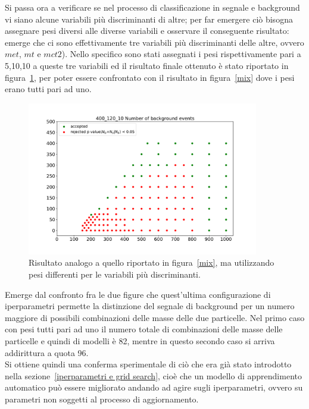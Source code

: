 \newpage

Si passa ora a verificare se nel processo di classificazione in segnale e background vi siano alcune variabili più discriminanti di altre; per far emergere ciò bisogna assegnare pesi diversi alle diverse variabili e osservare il conseguente risultato: emerge che ci sono effettivamente tre variabili più discriminanti delle altre, ovvero $\textit{met}$, $\textit{mt}$ e $\textit{mct2}$). Nello specifico sono stati assegnati i pesi rispettivamente pari a 5,10,10 a queste tre variabili ed il risultato finale ottenuto è stato riportato in figura~\ref{mix_ottimizzato}, per poter essere confrontato con il risultato in figura~\ref{mix} dove i pesi erano tutti pari ad uno.

\begin{figure}[h!]
	\centering
	\includegraphics[width=0.90\textwidth]{figs/risultati_simulazione/mix_ottimizzato.pdf}
	\caption{Risultato analogo a quello riportato in figura~\ref{mix}, ma utilizzando pesi differenti per le variabili più discriminanti.}
	\label{mix_ottimizzato}
\end{figure}

Emerge dal confronto fra le due figure che quest'ultima configurazione di iperparametri permette la distinzione del segnale di background per un numero maggiore di possibili combinazioni delle masse delle due particelle. Nel primo caso con pesi tutti pari ad uno il numero totale di combinazioni delle masse delle particelle e quindi di modelli è 82, mentre in questo secondo caso si arriva addirittura a quota 96. \\
Si ottiene quindi una conferma sperimentale di ciò che era già stato introdotto nella sezione~\ref{iperparametri e grid search}, cioè che un modello di apprendimento automatico può essere migliorato andando ad agire sugli iperparametri, ovvero su parametri non soggetti al processo di aggiornamento.


